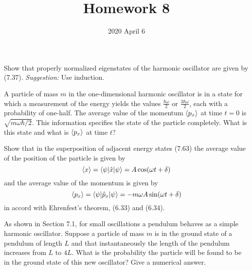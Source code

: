 \documentclass{../phys116}
\title{Homework 8}
\author{}
\date{2020 April 6}
\begin{document}
\begin{exercise}
  Show that properly normalized eigenstates of the harmonic oscillator
  are given by (7.37).  \textit{Suggestion:} Use induction.
\end{exercise}

\begin{solution}

\end{solution}

\begin{exercise}
  A particle of mass \(m\) in the one-dimensional harmonic oscillator
  is in a state for which a measurement of the energy yields the
  values \(\frac{\hbar \omega}{2}\) or \(\frac{3 \hbar \omega}{2}\),
  each with a probability of one-half.  The average value of the
  momentum \(\langle p_x\rangle\) at time \(t=0\) is
  \(\sqrt{m \omega \hbar/2}\).  This information specifies the state
  of the particle completely.  What is this state and what is
  \(\langle p_x\rangle\) at time \(t\)?
\end{exercise}

\begin{solution}

\end{solution}

\begin{exercise}
  Show that in the superposition of adjacent energy states (7.63) the
  average value of the position of the particle is given by
  \[
    \langle x\rangle = \langle\psi\rvert \hat x \lvert\psi\rangle = A \cos (\omega t + \delta)
  \]
  and the average value of the momentum is given by
  \[
    \langle p_x\rangle = \langle\psi\rvert \hat p_x \lvert\psi\rangle
    = - m \omega A \sin (\omega t + \delta)
  \]
  in accord with Ehrenfest's theorem, (6.33) and (6.34).
\end{exercise}

\begin{solution}

\end{solution}

\begin{exercise}
  As shown in Section 7.1, for small oscillations a pendulum behaves
  as a simple harmonic oscillator.  Suppose a particle of mass \(m\)
  is in the ground state of a pendulum of length \(L\) and that
  instantaneously the length of the pendulum increases from \(L\) to
  \(4L\).  What is the probability the particle will be found to be in
  the ground state of this new oscillator?  Give a numerical answer.
\end{exercise}

\begin{solution}

\end{solution}
\end{document}

